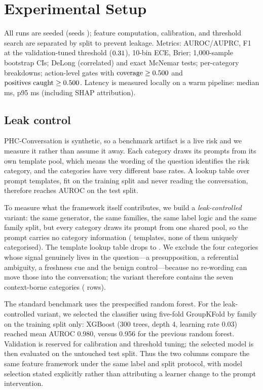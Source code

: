 \documentclass[10pt]{article}
\begin{document}
\section{Experimental Setup}
All runs are seeded (seeds \msses{}); feature computation, calibration, and
threshold search are separated by split to prevent leakage. Metrics:
AUROC/AUPRC, F1 at the validation-tuned threshold ($0.31$), 10-bin ECE,
Brier; 1{,}000-sample bootstrap CIs; DeLong (correlated) and exact McNemar
tests; per-category breakdowns; action-level gates with
$\text{coverage}\ge0.500$ and
$\text{positives caught}\ge0.500$. Latency is measured locally on a
warm pipeline: median \latmedian{} ms, p95 \lathigh{} ms (including SHAP
attribution).

\subsection{Leak control}
\label{sec:leakcontrol}
PHC-Conversation is synthetic, so a benchmark artifact is a live risk and we
measure it rather than assume it away. Each category draws its prompts from
its own template pool, which means the wording of the question identifies
the risk category, and the categories have very different base rates. A
lookup table over prompt templates, fit on the training split and never
reading the conversation, therefore reaches AUROC \lookupauroc{} on the test
split.

To measure what the framework itself contributes, we build a
\emph{leak-controlled} variant: the same generator, the same families, the
same label logic and the same family split, but every category draws its
prompt from one shared pool, so the prompt carries no category information
(\lctemplates{} templates, none of them uniquely categorised). The
template lookup table drops to \lcleakauc{}. We exclude the four categories
whose signal genuinely lives in the question---a presupposition, a
referential ambiguity, a freshness cue and the benign control---because no
re-wording can move those into the conversation; the variant therefore
contains the seven context-borne categories (\lcnrows{} rows).

The standard benchmark uses the prespecified random forest. For the
leak-controlled variant, we selected the classifier using five-fold
GroupKFold by family on the training split only: XGBoost (300 trees, depth 4,
learning rate 0.03) reached mean AUROC 0.980, versus 0.956 for the previous
random forest. Validation is reserved for calibration and threshold tuning;
the selected model is then evaluated on the untouched test split. Thus the
two columns compare the same feature framework under the same label and
split protocol, with model selection stated explicitly rather than
attributing a learner change to the prompt intervention.
\end{document}

